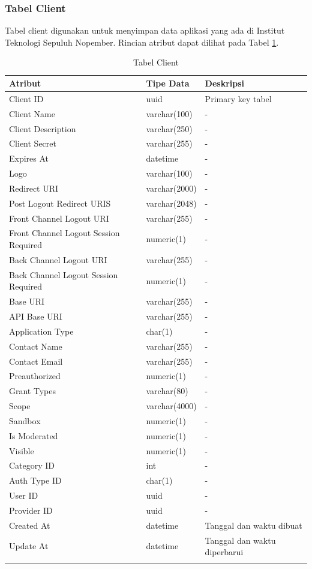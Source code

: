 \subsubsection{Tabel Client}
\par Tabel client digunakan untuk menyimpan data aplikasi yang ada di Institut Teknologi Sepuluh Nopember. Rincian atribut dapat dilihat pada Tabel \ref{tabel_client}.
\begin{longtable}{|p{2cm}|p{2.5cm}|p{4.5cm}|}
    \hline
    \textbf{Atribut} & \textbf{Tipe Data} & \textbf{Deskripsi} \\ \hline
    Client ID & uuid & Primary key tabel \\ \hline
    Client Name & varchar(100) & - \\ \hline
    Client Description & varchar(250) & - \\ \hline
    Client Secret & varchar(255) & - \\ \hline
    Expires At & datetime & - \\ \hline
    Logo & varchar(100) & - \\ \hline
    Redirect URI & varchar(2000) & - \\ \hline
    Post Logout Redirect URIS & varchar(2048) & - \\ \hline
    Front Channel Logout URI & varchar(255) & - \\ \hline
    Front Channel Logout Session Required & numeric(1) & - \\ \hline
    Back Channel Logout URI & varchar(255) & - \\ \hline
    Back Channel Logout Session Required & numeric(1) & - \\ \hline
    Base URI & varchar(255) & - \\ \hline
    API Base URI & varchar(255) & - \\ \hline
    Application Type & char(1) & - \\ \hline
    Contact Name & varchar(255) & - \\ \hline
    Contact Email & varchar(255) & - \\ \hline
    Preauthorized & numeric(1) & - \\ \hline
    Grant Types & varchar(80) & - \\ \hline
    Scope & varchar(4000) & - \\ \hline
    Sandbox & numeric(1) & - \\ \hline
    Is Moderated & numeric(1) & - \\ \hline
    Visible & numeric(1) & - \\ \hline
    Category ID & int & - \\ \hline
    Auth Type ID & char(1) & - \\ \hline
    User ID & uuid & - \\ \hline
    Provider ID & uuid & - \\ \hline
    Created At & datetime & Tanggal dan waktu dibuat \\ \hline
    Update At & datetime & Tanggal dan waktu diperbarui \\ \hline
    \caption{Tabel Client}
    \label{tabel_client}
\end{longtable}


